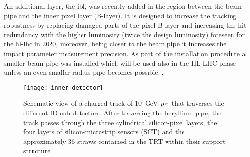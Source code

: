 An additional layer, the \gls{ibl}, was recently added in the region between the
beam pipe and the inner pixel layer (B-layer). It is designed to increase the
tracking robustness by replacing damaged parts of the pixel B-layer and
increasing the hit redundancy with the higher luminosity (twice the design
luminosity) foreseen for the \gls{hl-lhc} in 2020, moreover, being closer to the
beam pipe it increases the impact parameter measurement precision. As part of
the installation procedure a smaller beam pipe was installed which will be used
also in the HL-LHC phase unless an even smaller radius pipe becomes
possible~\cite{IBL}.

\begin{figure}[!h]
  \centering
    \texttt{[image: inner\_detector]}
    \caption{Schematic view of a charged track of 10~GeV $p_\mathrm{\, T}$ that traverses
      the different ID sub-detectors. After traversing the beryllium pipe, the
      track passes through the three cylindrical silicon-pixel layers, the four
      layers of silicon-microstrip sensors (SCT) and the approximately 36 straws
      contained in the TRT within their support structure.}
    \label{fig:id}
\end{figure}
